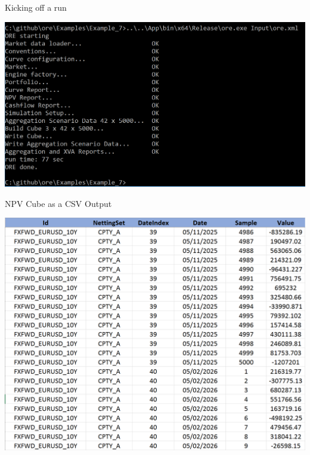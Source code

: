 \documentclass[t]{beamer}
\begin{document}
\begin{frame}{Kicking off a run}
	\begin{center}
		\includegraphics[scale=0.7]{pics/ore_console_run.png}
	\end{center}
\end{frame}


\begin{frame}{NPV Cube as a CSV Output}
	\begin{center}
		\includegraphics[scale=0.55]{pics/ore_csv_npv_cube.png}
	\end{center}
\end{frame}
\end{document}
